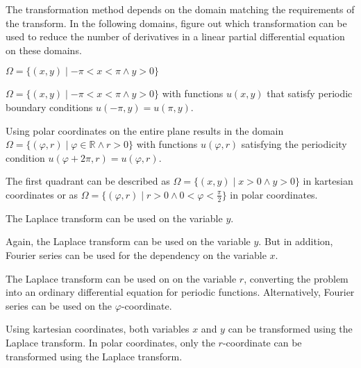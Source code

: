 The transformation method depends on the domain matching the requirements
of the transform.
In the following domains, figure out which transformation can be used
to reduce the number of derivatives in a linear partial differential
equation on these domains.
\begin{teilaufgaben}
\item
$\Omega = \{ (x,y) \mid -\pi < x <  \pi\wedge y > 0\}$
\item
$\Omega = \{ (x,y) \mid -\pi < x <  \pi\wedge y > 0\}$ with
functions $u(x,y)$ that satisfy periodic boundary conditions
$u(-\pi,y)=u(\pi,y)$.
\item
Using polar coordinates on the entire plane results in the domain
$\Omega = \{ (\varphi,r) \mid \varphi \in \mathbb{R}\wedge r > 0\}$
with functions $u(\varphi,r)$ satisfying the periodicity condition
$u(\varphi+2\pi,r)=u(\varphi,r)$.
\item
The first quadrant can be described as
$\Omega=\{(x,y)\mid x>0\wedge y>0\}$
in kartesian coordinates or as
$\Omega= \{(\varphi,r)\mid r>0\wedge 0< \varphi<\frac{\pi}2\}$
in polar coordinates.
\end{teilaufgaben}


\begin{loesung}
\begin{teilaufgaben}
\item
The Laplace transform can be used on the variable $y$.
\item
Again, the Laplace transform can be used on the variable $y$.
But in addition, Fourier series can be used for the dependency 
on the variable $x$.
\item
The Laplace transform can be used on on the variable $r$, converting
the problem into an ordinary differential equation for periodic functions.
Alternatively, Fourier series can be used on the $\varphi$-coordinate.
\item
Using kartesian coordinates, both variables $x$ and $y$ can be transformed
using the Laplace transform.
In polar coordinates, only the $r$-coordinate can be transformed using
the Laplace transform.
\qedhere
\end{teilaufgaben}
\end{loesung}


